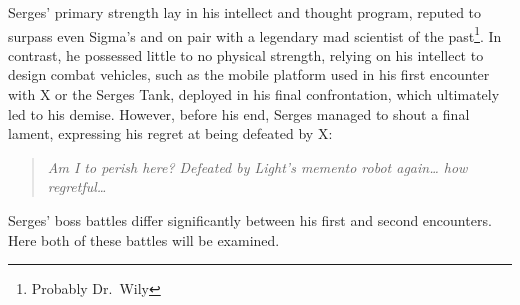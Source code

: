 Serges' primary strength lay in his intellect and thought program, reputed to surpass even Sigma's and on pair with a  legendary mad scientist of the past\footnote{Probably Dr.~Wily}. In contrast, he possessed little to no physical strength, relying on his intellect to design combat vehicles, such as the mobile platform used in his first encounter with X or the Serges Tank, deployed in his final confrontation, which ultimately led to his demise. However, before his end, Serges managed to shout a final lament, expressing his regret at being defeated by X:
\begin{quote}
	\textit{Am I to perish here? Defeated by Light’s memento robot again… how regretful…}~\cite{wordpress:X2_japanese_script}
\end{quote}

Serges' boss battles differ significantly between his first and second encounters. Here both of these battles will be examined.

